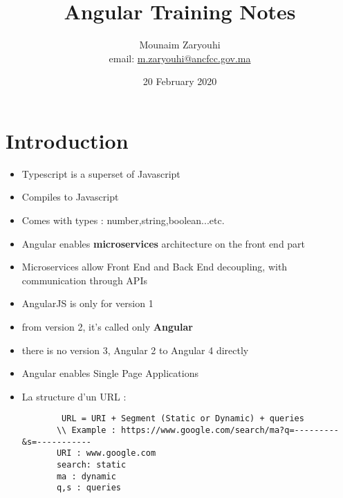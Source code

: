 \documentclass{article}
\title{\textbf{Angular Training Notes}}
\author{Mounaim Zaryouhi \\ email: \href{mailto:m.zaryouhi@ancfcc.gov.ma}{m.zaryouhi@ancfcc.gov.ma}}
\date{20 February 2020}
\begin{document}
\maketitle

\section{Introduction}
\begin{itemize}
    \item 
    Typescript is a superset of Javascript
    \item
    Compiles to Javascript
    \item
    Comes with types : number,string,boolean...etc.
    \item Angular enables \textbf{microservices} architecture on the front end part
    \item Microservices allow Front End and Back End decoupling, with communication through APIs
    \item AngularJS is only for version 1
    \item from version 2, it's called only \textbf{Angular}
    \item there is no version 3, Angular 2 to Angular 4 directly
    \item Angular enables Single Page Applications
    \item La structure d'un URL : 
    \begin{verbatim}
        URL = URI + Segment (Static or Dynamic) + queries
       \\ Example : https://www.google.com/search/ma?q=---------&s=-----------
       URI : www.google.com
       search: static
       ma : dynamic
       q,s : queries
    \end{verbatim}
    
    
    
\end{itemize}
\end{document}
